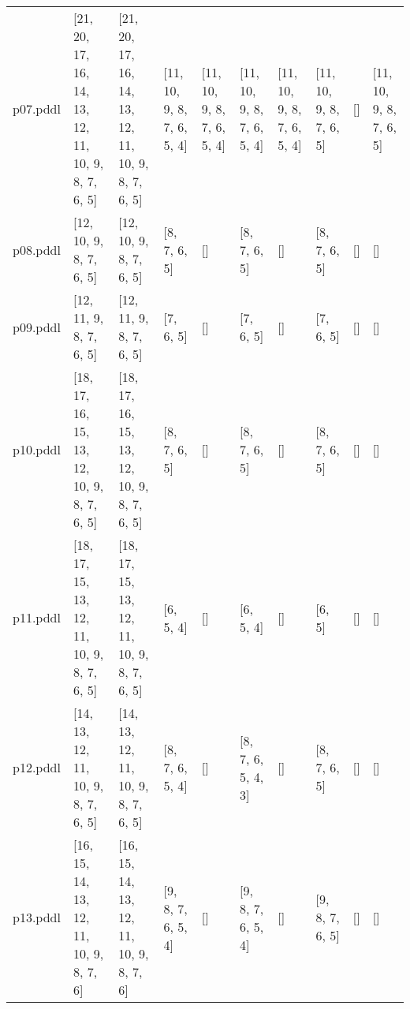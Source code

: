 \documentclass{article}
\begin{document}
\begin{tabular}{@{}lrrrrrrrrr@{}}
p07.pddl & \multicolumn{1}{|l|}{[21, 20, 17, 16, 14, 13, 12, 11, 10, 9, 8, 7, 6, 5]} & \multicolumn{1}{|l|}{[21, 20, 17, 16, 14, 13, 12, 11, 10, 9, 8, 7, 6, 5]} & \multicolumn{1}{|l|}{[11, 10, 9, 8, 7, 6, 5, 4]} & \multicolumn{1}{|l|}{[11, 10, 9, 8, 7, 6, 5, 4]} & \multicolumn{1}{|l|}{[11, 10, 9, 8, 7, 6, 5, 4]} & \multicolumn{1}{|l|}{[11, 10, 9, 8, 7, 6, 5, 4]} & \multicolumn{1}{|l|}{[11, 10, 9, 8, 7, 6, 5]} & \multicolumn{1}{|l|}{[]} & \multicolumn{1}{|l|}{[11, 10, 9, 8, 7, 6, 5]} \\
p08.pddl & \multicolumn{1}{|l|}{[12, 10, 9, 8, 7, 6, 5]} & \multicolumn{1}{|l|}{[12, 10, 9, 8, 7, 6, 5]} & \multicolumn{1}{|l|}{[8, 7, 6, 5]} & \multicolumn{1}{|l|}{[]} & \multicolumn{1}{|l|}{[8, 7, 6, 5]} & \multicolumn{1}{|l|}{[]} & \multicolumn{1}{|l|}{[8, 7, 6, 5]} & \multicolumn{1}{|l|}{[]} & \multicolumn{1}{|l|}{[]} \\
p09.pddl & \multicolumn{1}{|l|}{[12, 11, 9, 8, 7, 6, 5]} & \multicolumn{1}{|l|}{[12, 11, 9, 8, 7, 6, 5]} & \multicolumn{1}{|l|}{[7, 6, 5]} & \multicolumn{1}{|l|}{[]} & \multicolumn{1}{|l|}{[7, 6, 5]} & \multicolumn{1}{|l|}{[]} & \multicolumn{1}{|l|}{[7, 6, 5]} & \multicolumn{1}{|l|}{[]} & \multicolumn{1}{|l|}{[]} \\
p10.pddl & \multicolumn{1}{|l|}{[18, 17, 16, 15, 13, 12, 10, 9, 8, 7, 6, 5]} & \multicolumn{1}{|l|}{[18, 17, 16, 15, 13, 12, 10, 9, 8, 7, 6, 5]} & \multicolumn{1}{|l|}{[8, 7, 6, 5]} & \multicolumn{1}{|l|}{[]} & \multicolumn{1}{|l|}{[8, 7, 6, 5]} & \multicolumn{1}{|l|}{[]} & \multicolumn{1}{|l|}{[8, 7, 6, 5]} & \multicolumn{1}{|l|}{[]} & \multicolumn{1}{|l|}{[]} \\
p11.pddl & \multicolumn{1}{|l|}{[18, 17, 15, 13, 12, 11, 10, 9, 8, 7, 6, 5]} & \multicolumn{1}{|l|}{[18, 17, 15, 13, 12, 11, 10, 9, 8, 7, 6, 5]} & \multicolumn{1}{|l|}{[6, 5, 4]} & \multicolumn{1}{|l|}{[]} & \multicolumn{1}{|l|}{[6, 5, 4]} & \multicolumn{1}{|l|}{[]} & \multicolumn{1}{|l|}{[6, 5]} & \multicolumn{1}{|l|}{[]} & \multicolumn{1}{|l|}{[]} \\
p12.pddl & \multicolumn{1}{|l|}{[14, 13, 12, 11, 10, 9, 8, 7, 6, 5]} & \multicolumn{1}{|l|}{[14, 13, 12, 11, 10, 9, 8, 7, 6, 5]} & \multicolumn{1}{|l|}{[8, 7, 6, 5, 4]} & \multicolumn{1}{|l|}{[]} & \multicolumn{1}{|l|}{[8, 7, 6, 5, 4, 3]} & \multicolumn{1}{|l|}{[]} & \multicolumn{1}{|l|}{[8, 7, 6, 5]} & \multicolumn{1}{|l|}{[]} & \multicolumn{1}{|l|}{[]} \\
p13.pddl & \multicolumn{1}{|l|}{[16, 15, 14, 13, 12, 11, 10, 9, 8, 7, 6]} & \multicolumn{1}{|l|}{[16, 15, 14, 13, 12, 11, 10, 9, 8, 7, 6]} & \multicolumn{1}{|l|}{[9, 8, 7, 6, 5, 4]} & \multicolumn{1}{|l|}{[]} & \multicolumn{1}{|l|}{[9, 8, 7, 6, 5, 4]} & \multicolumn{1}{|l|}{[]} & \multicolumn{1}{|l|}{[9, 8, 7, 6, 5]} & \multicolumn{1}{|l|}{[]} & \multicolumn{1}{|l|}{[]} \\

\end{tabular}
\end{document}
